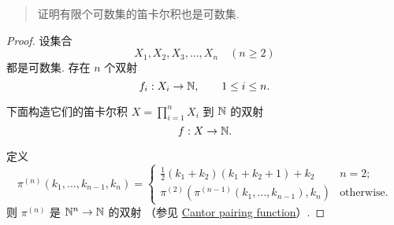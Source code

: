 \begin{quotation}
    证明有限个可数集的笛卡尔积也是可数集.
\end{quotation}

\begin{proof}
    设集合
    \[
        X_1, X_2, X_3, \dots, X_n \quad(n \ge 2)
    \]
    都是可数集. 存在 $n$ 个双射
    \begin{equation}
        f_i: X_i \to \mathbb{N}, \qquad 1 \le i \le n.
    \end{equation}

    下面构造它们的笛卡尔积
    $X = \prod_{i=1}^n{X_i}$
    到
    $\mathbb{N}$
    的双射
    \begin{equation*}
        f: X \to \mathbb{N}.
    \end{equation*}

    定义
    \begin{equation}
        \pi^{(n)}(k_1, \dots, k_{n-1}, k_n) = \begin{cases}
            \frac{1}{2}(k_1 + k_2)(k_1 + k_2 + 1) + k_2 & n = 2; \\
            \pi^{(2)}(
                \pi^{(n - 1)}(k_1, \dots, k_{n-1}),
                k_n
            ) & \text{otherwise}.
        \end{cases}
    \end{equation}
    则 $\pi^{(n)}$ 是 $\mathbb{N}^n \to \mathbb{N}$ 的双射
    （参见 \href{https://en.wikipedia.org/wiki/Pairing_function#Cantor_pairing_function}{Cantor pairing function}）.
\end{proof}

